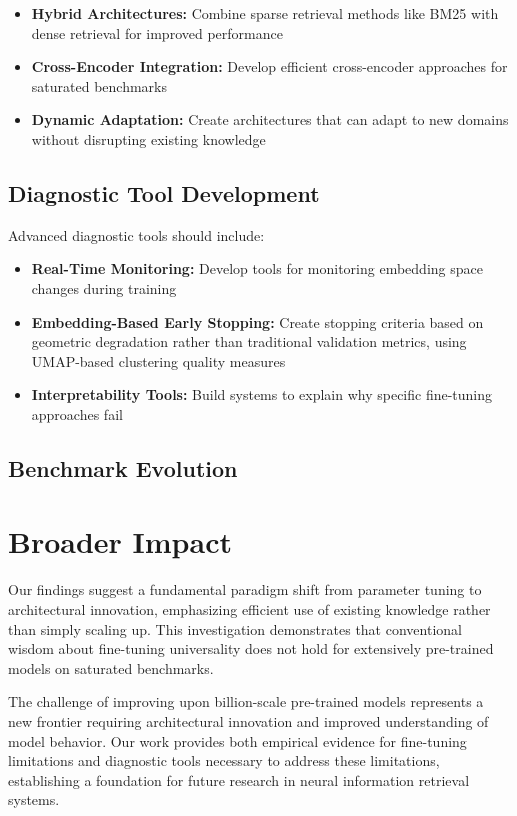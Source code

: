 \begin{itemize}
\item \textbf{Hybrid Architectures:} Combine sparse retrieval methods like BM25 with dense retrieval for improved performance
\item \textbf{Cross-Encoder Integration:} Develop efficient cross-encoder approaches for saturated benchmarks
\item \textbf{Dynamic Adaptation:} Create architectures that can adapt to new domains without disrupting existing knowledge
\end{itemize}

\subsection{Diagnostic Tool Development}

Advanced diagnostic tools should include:

\begin{itemize}
\item \textbf{Real-Time Monitoring:} Develop tools for monitoring embedding space changes during training
\item \textbf{Embedding-Based Early Stopping:} Create stopping criteria based on geometric degradation rather than traditional validation metrics, using UMAP-based clustering quality measures
\item \textbf{Interpretability Tools:} Build systems to explain why specific fine-tuning approaches fail
\end{itemize}

\subsection{Benchmark Evolution}
\section{Broader Impact}

Our findings suggest a fundamental paradigm shift from parameter tuning to architectural innovation, emphasizing efficient use of existing knowledge rather than simply scaling up. This investigation demonstrates that conventional wisdom about fine-tuning universality does not hold for extensively pre-trained models on saturated benchmarks.

The challenge of improving upon billion-scale pre-trained models represents a new frontier requiring architectural innovation and improved understanding of model behavior. Our work provides both empirical evidence for fine-tuning limitations and diagnostic tools necessary to address these limitations, establishing a foundation for future research in neural information retrieval systems.